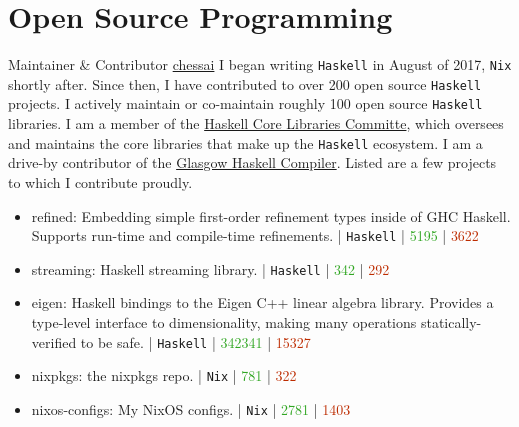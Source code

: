 \documentclass[10pt,letterpaper,sans]{moderncv}
\newcommand{\wlink}[2]{\textcolor[HTML]{461645}{\href{#1}{#2}}}
\newcommand{\ghlink}[2]{\wlink{https://github.com/#1}{#2}}
\newcommand{\ghrepo}[1]{\ghlink{#1}{\faGithub}}
\newcommand{\ghlang}[1]{\texttt{#1}}
\newcommand{\ghadd}[1]{\textcolor[HTML]{30A622}{{\faPlusCircle} #1}}
\newcommand{\ghrem}[1]{\textcolor[HTML]{BD2C00}{{\faMinusCircle} #1}}
\newcommand{\ghub}[4]{\ghrepo{#2} | \ghlang{#1} | \ghadd{#3} | \ghrem{#4}}
\newcommand{\lang}[1]{\texttt{#1}}
\begin{document}

\section{Open Source Programming}
  {Maintainer \& Contributor}
  {\wlink{https://github.com/chessai}{chessai}}
  {\newline I began writing \lang{Haskell} in August of 2017, \lang{Nix} shortly after. Since then, I have contributed to over 200 open source \lang{Haskell} projects. I actively maintain or co-maintain roughly 100 open source \lang{Haskell} libraries. I am a member of the \wlink{https://wiki.haskell.org/Core_Libraries_Committee}{Haskell Core Libraries Committe}, which oversees and maintains the core libraries that make up the \lang{Haskell} ecosystem. I am a drive-by contributor of the \wlink{https://www.haskell.org/ghc/}{Glasgow Haskell Compiler}. Listed are a few projects to which I contribute proudly.
  }
  {}
  {
\begin{itemize}
  \item refined: Embedding simple first-order refinement types inside of GHC Haskell. Supports run-time and compile-time refinements. \newline \ghub{Haskell}{chessai/refined}{5195}{3622}
  \item streaming: Haskell streaming library. \newline \ghub{Haskell}{haskell-streaming/streaming}{342}{292}
  \item eigen: Haskell bindings to the Eigen C++ linear algebra library. Provides a type-level interface to dimensionality, making many operations statically-verified to be safe. \newline \ghub{Haskell}{chessai/eigen}{342341}{15327}
  \item nixpkgs: the nixpkgs repo. \newline \ghub{Nix}{NixOS/nixpkgs}{781}{322}
  \item nixos-configs: My NixOS configs. \newline \ghub{Nix}{chessai/nixos-configs}{2781}{1403}
\end{itemize}
}
\end{document}
